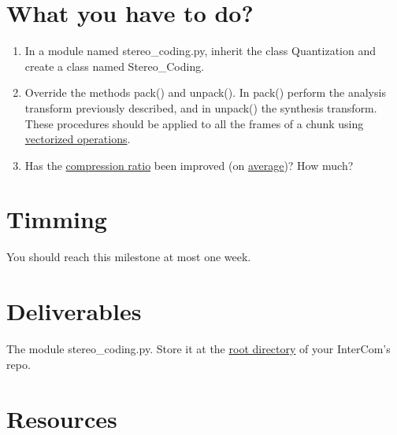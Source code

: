 \section{What you have to do?}

\begin{enumerate}
\item In a module named stereo\_coding.py, inherit the class
  Quantization and create a class named Stereo\_Coding.
\item Override the methods pack() and unpack(). In pack() perform the
  analysis transform previously described, and in unpack() the
  synthesis transform. These procedures should be applied to all the
  frames of a chunk using
  \href{https://www.oreilly.com/library/view/python-for-data/9781449323592/ch04.html}{vectorized
    operations}.
\item Has the
  \href{https://en.wikipedia.org/wiki/Data_compression_ratio}{compression
    ratio} been improved (on
  \href{https://en.wikipedia.org/wiki/Average}{average})? How much?
\end{enumerate}

\section{Timming}

You should reach this milestone at most one week.

\section{Deliverables}

The module stereo\_coding.py. Store it at the
\href{https://github.com/Tecnologias-multimedia/intercom}{root
  directory} of your InterCom's repo.

\section{Resources}


